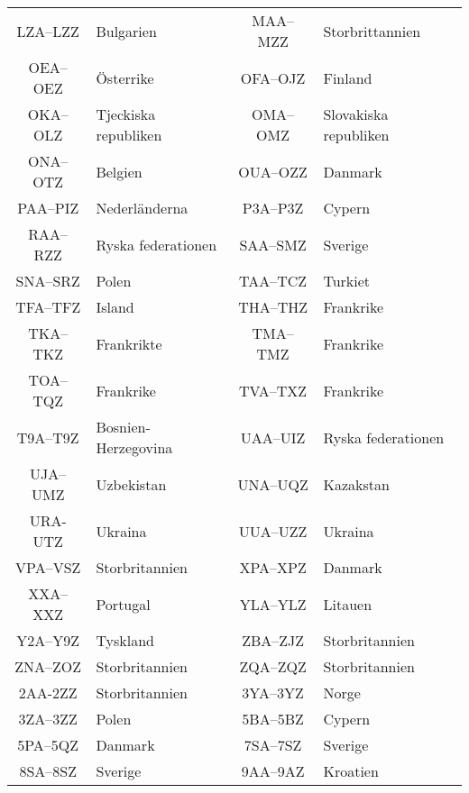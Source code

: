 \begin{center}
\begin{longtable}{cl|cl}
	      LZA--LZZ     & Bulgarien            & MAA--MZZ        & Storbrittannien       \\
	      OEA--OEZ     & Österrike            & OFA--OJZ        & Finland               \\
	      OKA--OLZ     & Tjeckiska republiken & OMA--OMZ        & Slovakiska republiken \\
	      ONA--OTZ     & Belgien              & OUA--OZZ        & Danmark               \\
	      PAA--PIZ     & Nederländerna        & P3A--P3Z        & Cypern                \\
	      RAA--RZZ     & Ryska federationen   & SAA--SMZ        & Sverige               \\
	      SNA--SRZ     & Polen                & TAA--TCZ        & Turkiet               \\
	      TFA--TFZ     & Island               & THA--THZ        & Frankrike             \\
	      TKA--TKZ     & Frankrikte           & TMA--TMZ        & Frankrike             \\
	      TOA--TQZ     & Frankrike            & TVA--TXZ        & Frankrike             \\
	      T9A--T9Z     & Bosnien-Herzegovina  & UAA--UIZ        & Ryska federationen    \\
	      UJA--UMZ     & Uzbekistan           & UNA--UQZ        & Kazakstan             \\
	       URA-UTZ     & Ukraina              & UUA--UZZ        & Ukraina               \\
	      VPA--VSZ     & Storbritannien       & XPA--XPZ        & Danmark               \\
	      XXA--XXZ     & Portugal             & YLA--YLZ        & Litauen               \\
	      Y2A--Y9Z     & Tyskland             & ZBA--ZJZ        & Storbritannien        \\
	      ZNA--ZOZ     & Storbritannien       & ZQA--ZQZ        & Storbritannien        \\
	       2AA-2ZZ     & Storbritannien       & 3YA--3YZ        & Norge                 \\
	      3ZA--3ZZ     & Polen                & 5BA--5BZ        & Cypern                \\
	      5PA--5QZ     & Danmark              & 7SA--7SZ        & Sverige               \\
	      8SA--8SZ     & Sverige              & 9AA--9AZ        & Kroatien
\end{longtable}
\end{center}

